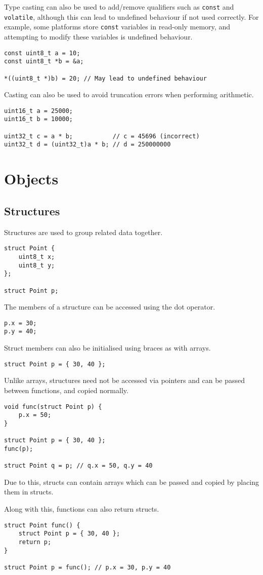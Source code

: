 \documentclass{article}
\begin{document}
Type casting can also be used to add/remove qualifiers such as
\texttt{const} and \texttt{volatile}, although this can
lead to undefined behaviour if not used correctly. For example, some
platforms store \texttt{const} variables in read-only memory,
and attempting to modify these variables is undefined behaviour.
\begin{verbatim}
const uint8_t a = 10;
const uint8_t *b = &a;

*((uint8_t *)b) = 20; // May lead to undefined behaviour
\end{verbatim}
Casting can also be used to avoid truncation errors when performing
arithmetic.
\begin{verbatim}
uint16_t a = 25000;
uint16_t b = 10000;

uint32_t c = a * b;           // c = 45696 (incorrect)
uint32_t d = (uint32_t)a * b; // d = 250000000
\end{verbatim}
\section{Objects}
\subsection{Structures}
Structures are used to group related data together.
\begin{verbatim}
struct Point {
    uint8_t x;
    uint8_t y;
};

struct Point p;
\end{verbatim}
The members of a structure can be accessed using the dot operator.
\begin{verbatim}
p.x = 30;
p.y = 40;
\end{verbatim}
Struct members can also be initialised using braces as with arrays.
\begin{verbatim}
struct Point p = { 30, 40 };
\end{verbatim}
Unlike arrays, structures need not be accessed via pointers and can be
passed between functions, and copied normally.
\begin{verbatim}
void func(struct Point p) {
    p.x = 50;
}

struct Point p = { 30, 40 };
func(p);

struct Point q = p; // q.x = 50, q.y = 40
\end{verbatim}
Due to this, structs can contain arrays which can be passed and copied
by placing them in structs.

Along with this, functions can also return structs.
\begin{verbatim}
struct Point func() {
    struct Point p = { 30, 40 };
    return p;
}

struct Point p = func(); // p.x = 30, p.y = 40
\end{verbatim}
\end{document}
